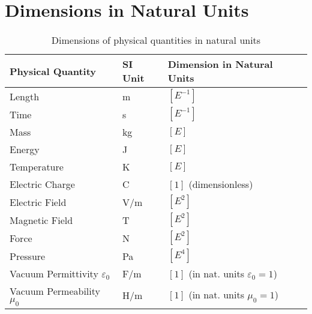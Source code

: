 \documentclass[12pt,a4paper]{article}
\begin{document}
	\section{Dimensions in Natural Units}
	
	\begin{table}[h]
		\centering
		\begin{tabular}{lll}
			\toprule
			\textbf{Physical Quantity} & \textbf{SI Unit} & \textbf{Dimension in Natural Units} \\
			\midrule
			Length & m & $[E^{-1}]$ \\
			Time & s & $[E^{-1}]$ \\
			Mass & kg & $[E]$ \\
			Energy & J & $[E]$ \\
			Temperature & K & $[E]$ \\
			Electric Charge & C & $[1]$ (dimensionless) \\
			Electric Field & V/m & $[E^2]$ \\
			Magnetic Field & T & $[E^2]$ \\
			Force & N & $[E^2]$ \\
			Pressure & Pa & $[E^4]$ \\
			Vacuum Permittivity $\varepsilon_0$ & F/m & $[1]$ (in nat. units $\varepsilon_0 = 1$) \\
			Vacuum Permeability $\mu_0$ & H/m & $[1]$ (in nat. units $\mu_0 = 1$) \\
			\bottomrule
		\end{tabular}
		\caption{Dimensions of physical quantities in natural units}
	\end{table}
	
\end{document}
